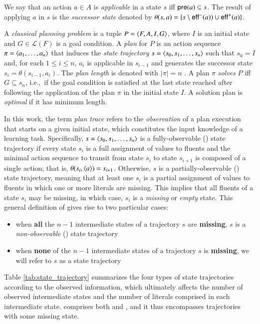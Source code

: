 We say that an action $a\in A$ is {\em applicable} in a state $s$ iff $\mathsf{pre}(a)\subseteq s$. The result of applying $a$ in $s$ is the {\em successor state} denoted by $\theta(s,a)=\{s\setminus\mathsf{eff}^-(a))\cup\mathsf{eff}^+(a)\}$.

A {\em classical planning problem} is a tuple $P={\langle F,A,I,G \rangle}$, where $I$ is an initial state and $G\in\mathcal{L}(F)$ is a goal condition. A {\em plan} for $P$ is an action sequence $\pi={\langle a_1, \ldots, a_n \rangle}$ that induces the {\em state trajectory} $s={\langle s_0, s_1, \ldots, s_n \rangle}$ such that $s_0=I$ and, for each {\small $1\leq i\leq n$}, $a_i$ is applicable in $s_{i-1}$ and generates the successor state $s_i=\theta(s_{i-1},a_i)$. The {\em plan length} is denoted with $|\pi|=n$ . A plan $\pi$ {\em solves} $P$ iff $G\subseteq s_n$, i.e.,~if the goal condition is satisfied at the last state reached after following the application of the plan $\pi$ in the initial state $I$. A solution plan is {\em optimal} if it has minimum length.

In this work, the term \emph{plan trace} refers to the \emph{observation} of a plan execution that starts on a given initial state, which constitutes the input knowledge of a learning task. Specifically, $s={\langle s_0, s_1, \ldots, s_n \rangle}$ is a fully-observable (\FO) state trajectory if every state $s_i$ is a full assignment of values to fluents and the minimal action sequence to transit from state $s_i$ to state $s_{i+1}$ is composed of a single action; that is, $\theta(s_i,{\langle a \rangle})=s_{i+1}$. Otherwise, $s$ is a partially-observable (\PO) state trajectory, meaning that at least one $s_i$ is a partial assignment of values to fluents in which one or more literals are missing. This implies that all fluents of a state $s_i$ may be missing, in which case, $s_i$ is a \emph{missing} or \emph{empty} state. This general definition of \PO gives rise to two particular cases:

\begin{itemize}
\item when \textbf{all} the $n-1$ intermediate states of a trajectory $s$ are \textbf{missing}, $s$ is a \emph{non-observable} (\NO) state trajectory
\item when \textbf{none} of the $n-1$ intermediate states of a trajectory $s$ is \textbf{missing}, we will refer to $s$ as a \POstar state trajectory
\end{itemize}


Table \ref{tab:state_trajectory} summarizes the four types of state trajectories according to the observed information, which ultimately affects the number of observed intermediate states and the number of literals comprised in each intermediate state. \PO comprises both \POstar and \NO, and it thus encompasses trajectories with some missing state.

